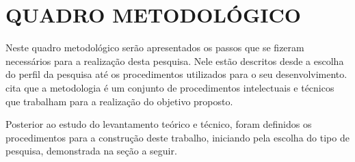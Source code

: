\chapter{QUADRO METODOLÓGICO}
\label{cap:quadroMetodologico}


\par Neste quadro metodológico serão apresentados os passos que se fizeram necessários para a realização desta pesquisa. Nele estão descritos desde a escolha do perfil da pesquisa até os procedimentos utilizados para o seu desenvolvimento.  cita que a metodologia é um conjunto de procedimentos intelectuais e técnicos que trabalham para a realização do objetivo proposto.
\par Posterior ao estudo do levantamento teórico e técnico, foram definidos os procedimentos para a construção deste trabalho, iniciando pela escolha do tipo de pesquisa, demonstrada na seção a seguir.







%



%

%



%

%